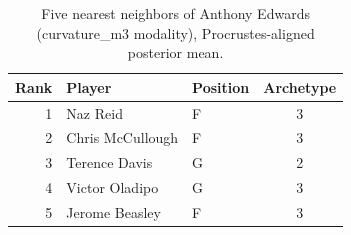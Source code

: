 \begin{table}[htbp]
  \centering\small
  \begin{tabular}{rllc}
    \toprule
    Rank & Player & Position & Archetype \\
    \midrule
    1 & Naz Reid & F & 3 \\
    2 & Chris McCullough & F & 3 \\
    3 & Terence Davis & G & 2 \\
    4 & Victor Oladipo & G & 3 \\
    5 & Jerome Beasley & F & 3 \\
    \bottomrule
  \end{tabular}
  \caption{Five nearest neighbors of Anthony Edwards (curvature_m3 modality), Procrustes-aligned posterior mean.}
  \label{tab:Anthony_Edwards_neighbors_curvature_m3}
\end{table}

